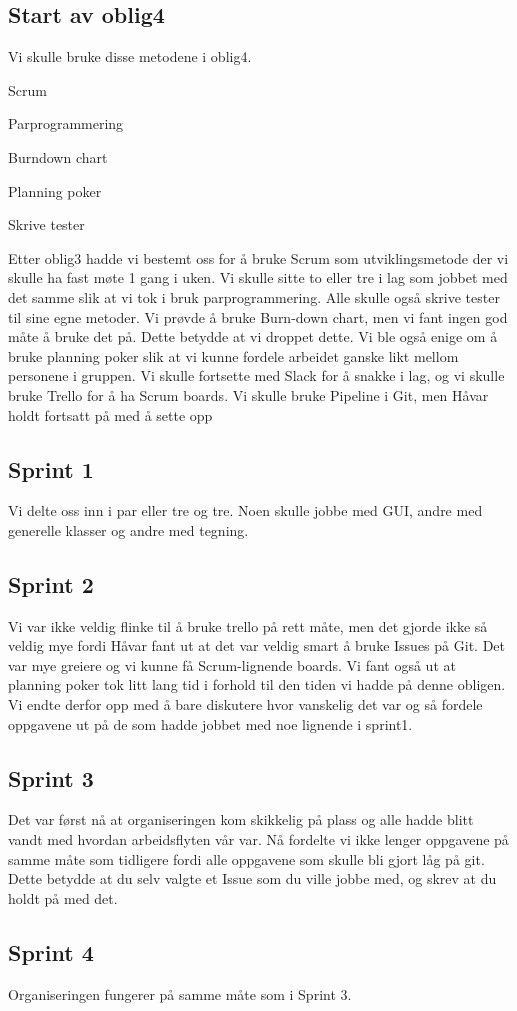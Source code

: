 \documentclass[11pt]{meetingmins}
\begin{document}
\subsection{Start av oblig4}
Vi skulle bruke disse metodene i oblig4.
\begin{items}
\item Scrum
\item Parprogrammering
\item Burndown chart
\item Planning poker
\item Skrive tester
\end{items}

Etter oblig3 hadde vi bestemt oss for å bruke Scrum som utviklingsmetode der vi skulle ha fast møte 1 gang i uken. Vi skulle sitte to eller tre i lag som jobbet med det samme slik at vi tok i bruk parprogrammering. Alle skulle også skrive tester til sine egne metoder. Vi prøvde å bruke Burn-down chart, men vi fant ingen god måte å bruke det på. Dette betydde at vi droppet dette. Vi ble også enige om å bruke planning poker slik at vi kunne fordele arbeidet ganske likt mellom personene i gruppen. Vi skulle fortsette med Slack for å snakke i lag, og vi skulle bruke Trello for å ha Scrum boards. Vi skulle bruke Pipeline i Git, men Håvar holdt fortsatt på med å sette opp 

\subsection{Sprint 1}
Vi delte oss inn i par eller tre og tre. Noen skulle jobbe med GUI, andre med generelle klasser og andre med tegning.

\subsection{Sprint 2}
Vi var ikke veldig flinke til å bruke trello på rett måte, men det gjorde ikke så veldig mye fordi Håvar fant ut at det var veldig smart å bruke Issues på Git. Det var mye greiere og vi kunne få Scrum-lignende boards. Vi fant også ut at planning poker tok litt lang tid i forhold til den tiden vi hadde på denne obligen. Vi endte derfor opp med å bare diskutere hvor vanskelig det var og så fordele oppgavene ut på de som hadde jobbet med noe lignende i sprint1.

\subsection{Sprint 3}
Det var først nå at organiseringen kom skikkelig på plass og alle hadde blitt vandt med hvordan arbeidsflyten vår var. Nå fordelte vi ikke lenger oppgavene på samme måte som tidligere fordi alle oppgavene som skulle bli gjort låg på git. Dette betydde at du selv valgte et Issue som du ville jobbe med, og skrev at du holdt på med det. 

\subsection{Sprint 4}
Organiseringen fungerer på samme måte som i Sprint 3. 

\vspace{1em}
\end{document}

